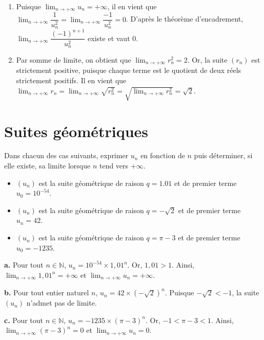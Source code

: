 \documentclass[11pt,fleqn, openany]{book} %
\begin{document}
\begin{solution}
\begin{enumerate}
\begin{enumerate}
\item Puisque \(\displaystyle\lim_{n\to+\infty}u_n=+\infty\), il en vient que \(\displaystyle\lim_{n\to+\infty}\dfrac{1}{u_n^2}=\displaystyle\lim_{n\to+\infty}\dfrac{-1}{u_n^2}=0\). D'après le théorème d'encadrement, \(\displaystyle\lim_{n\to+\infty}\dfrac{(-1)^{n+1}}{u_n^2}\) existe et vaut 0.

 \item Par somme de limite, on obtient que \(\displaystyle\lim_{n\to+\infty}r_n^2=2\). Or, la suite \((r_n)\) est strictement positive, puisque chaque terme est le quotient de deux réels strictement positifs. Il en vient que $\displaystyle\lim_{n\to+\infty}r_n = \displaystyle\lim_{n\to+\infty}\sqrt{r_n^2}=\sqrt{\displaystyle\lim_{n\to+\infty}r_n^2}=\sqrt{2}$.\end{enumerate}\end{enumerate}
 \end{solution}
 
 


\section*{Suites géométriques}

\begin{exercise}Dans chacun des cas suivants, exprimer $u_n$ en fonction de $n$ puis déterminer, si elle existe, sa limite lorsque $n$ tend vers $+\infty$.

\begin{itemize}
\item $ (u_n)$ est la suite géométrique de raison $q=1.01$ et de premier terme $u_0=10^{-54}$.
\item $(u_n)$ est la suite géométrique de raison $q=-\sqrt{2}$ et de premier terme $u_n=42$.
\item $ (u_n)$ est la suite géométrique de raison $q=\pi-3$ et de premier terme $u_0=-1235$.\end{itemize}
\end{exercise}
\begin{solution}\textbf{a.} Pour tout $n\in\mathbb{N}$, $u_n=10^{-54} \times 1,01 ^n$. Or, $1,01>1$. Ainsi, $\displaystyle \lim_{n \to +\infty} 1,01^n= +\infty$ et $\displaystyle \lim_{n \to +\infty} u_n = +\infty$.

\textbf{b.} Pour tout entier naturel $n$, $u_n=42 \times (-\sqrt{2})^n$. Puisque $-\sqrt{2}<-1$, la suite $(u_n)$ n'admet pas de limite.

\textbf{c.} Pour tout $n\in\mathbb{N}$, $u_n = -1235 \times (\pi-3)^n$. Or, $-1<\pi-3<1$. Ainsi, $\displaystyle \lim_{n\to+\infty}(\pi-3)^n=0$ et $\displaystyle \lim_{n\to+\infty}u_n=0$.\end{solution}
\end{document}
